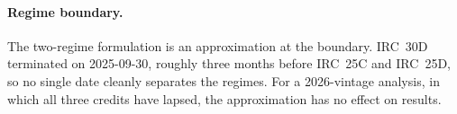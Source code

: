 \documentclass[11pt]{article}
\begin{document}
\paragraph{Regime boundary.} The two-regime formulation is an approximation at the
boundary. IRC~30D terminated on 2025-09-30, roughly three months before IRC~25C and
IRC~25D, so no single date cleanly separates the regimes. For a 2026-vintage analysis,
in which all three credits have lapsed, the approximation has no effect on results.
\end{document}
